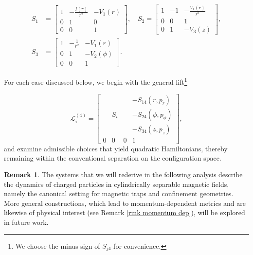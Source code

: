 \documentclass[10pt]{amsart}
\numberwithin{equation}{section}
\theoremstyle{definition}
\newtheorem{remark}{\textbf{Remark}}
\begin{document}
\begin{equation} \label{S3 cyl}
	\begin{split}
		S_1 &= \left[\begin{array}{ccc}
			1 & -\frac{f(r)}{r^{2}} & -V_1(r) \\
			0 & 1 & 0 \\
			0 & 0 & 1 
		\end{array}\right], \quad
		S_2 = \left[\begin{array}{ccc}
			1 & -1 & -\frac{V_1(r)}{r^2} \\
			0 & 0 & 1 \\
			0 & 1 & -V_3(z) 
		\end{array}\right], \\
		S_3 &= \left[\begin{array}{ccc}
			1 & -\frac{1}{r^{2}} & -V_1(r) \\
			0 & 1 & -V_2(\phi) \\
			0 & 0 & 1 
		\end{array}\right].
	\end{split}
\end{equation}

For each case discussed below, we begin with the general lift\footnote{We choose the minus sign of $S_{j4}$ for convenience.} 

\begin{equation}
	\mathcal{L}^{(4)}_i = \left[\begin{array}{ccc|c}
		& & &-S_{14}(r, p_r) \\
		& S_i & & -S_{24}(\phi, p_\phi) \\
		& & &- S_{34}(z, p_z) \\ \hline
		0 & 0 & 0 & 1
	\end{array}\right],
\end{equation}
and examine admissible choices that yield quadratic Hamiltonians, thereby remaining within the conventional separation on the configuration space. 

\vspace{2mm}

\begin{remark}
	The systems that we will rederive in the following analysis describe the dynamics of charged particles in cylindrically separable magnetic fields, namely the canonical setting for magnetic traps and confinement geometries. More general constructions, which lead to momentum-dependent metrics and are likewise of physical interest (see Remark \ref{rmk momentum dep}), will be explored in future work.
\end{remark}
\end{document}
